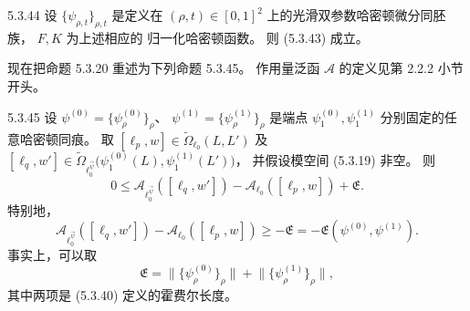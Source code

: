 \begin{lemma}{5.3.44}\label{lem:5-3-44}
设 $\{\psi_{\rho,t}\}_{\rho,t}$
是定义在 $(\rho,t)\in[0,1]^2$
上的光滑双参数哈密顿微分同胚族，
$F,K$ 为上述相应的
归一化哈密顿函数。
则 (5.3.43) 成立。
\end{lemma}

现在把命题 5.3.20
重述为下列命题 5.3.45。
作用量泛函 $\mathcal A$
的定义见第 2.2.2 小节开头。

\begin{proposition}{5.3.45}\label{prop:5-3-45}
设
$\psi^{(0)}
=\{\psi_\rho^{(0)}\}_\rho$、
$\psi^{(1)}
=\{\psi_\rho^{(1)}\}_\rho$
是端点
$\psi_1^{(0)},\psi_1^{(1)}$
分别固定的任意哈密顿同痕。
取
$[\ell_p,w]\in
\widetilde\Omega_{\ell_0}(L,L')$
及
$[\ell_q,w']\in
\widetilde\Omega_{\ell_0^{\vec\psi}}
\bigl(
\psi_1^{(0)}(L),
\psi_1^{(1)}(L')
\bigr)$，
并假设模空间 (5.3.19) 非空。
则
\begin{equation}
0\le
\mathcal A_{\ell_0^{\vec\psi}}
([\ell_q,w'])
-\mathcal A_{\ell_0}([\ell_p,w])
+\mathfrak E.
\tag{5.3.46.1}\label{eq:5-3-46-1}
\end{equation}
特别地，
\begin{equation}
\mathcal A_{\ell_0^{\vec\psi}}
([\ell_q,w'])
-\mathcal A_{\ell_0}([\ell_p,w])
\ge-\mathfrak E
=-\mathfrak E(\psi^{(0)},\psi^{(1)}).
\tag{5.3.46.2}\label{eq:5-3-46-2}
\end{equation}
事实上，可以取
\begin{equation}
\mathfrak E
=\bigl\|\{\psi_\rho^{(0)}\}_\rho\bigr\|
+\bigl\|\{\psi_\rho^{(1)}\}_\rho\bigr\|,
\tag{5.3.47}\label{eq:5-3-47}
\end{equation}
其中两项是 (5.3.40)
定义的霍费尔长度。
\end{proposition}

